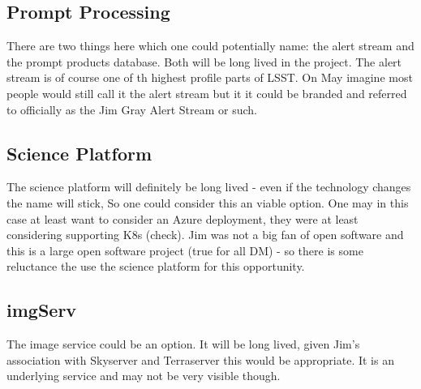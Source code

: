 \subsection{Prompt Processing}
There are two things here which one could potentially name: the alert stream and the prompt products database.
Both will be long lived in the project. The alert stream is of course one of th highest profile parts of LSST.
On May imagine most people would still call it the alert stream but it it could be branded and referred to officially as
the Jim Gray Alert Stream or such.

\subsection{Science Platform} \label{sec:sciplat}
 The science platform will definitely be long lived - even if the technology changes the name will stick, So one could consider this an viable option. One may in this case at least want to consider an Azure deployment, they were at least considering supporting K8s (check).
Jim was not a big fan of open software and this is a large open software project (true for all DM) - so there is some reluctance the use the science platform for this opportunity.


\subsection{imgServ}
The image service could be an option. It will be long lived, given Jim's association with Skyserver and Terraserver this
would be appropriate. It is an underlying service and may not be very visible though.

